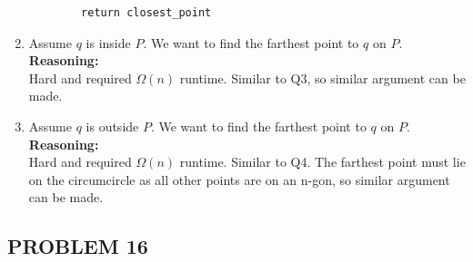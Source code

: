 \documentclass{article}
\begin{document}
\begin{enumerate}
\begin{verbatim}
        return closest_point
    \end{verbatim}
    \item Assume $q$ is inside $P$. We want to find the farthest point to $q$ on $P$.
    \\
    \textbf{Reasoning: }
    \\
    Hard and required $\Omega(n)$ runtime. Similar to Q3, so similar argument can be made.
    \item Assume $q$ is outside $P$. We want to find the farthest point to $q$ on $P$.
    \\
    \textbf{Reasoning: }
    \\
    Hard and required $\Omega(n)$ runtime. Similar to Q4. The farthest point must lie on the circumcircle as all other points are on an n-gon, so similar argument can be made.
\end{enumerate}

\newpage

\subsection*{PROBLEM 16}
\end{document}
